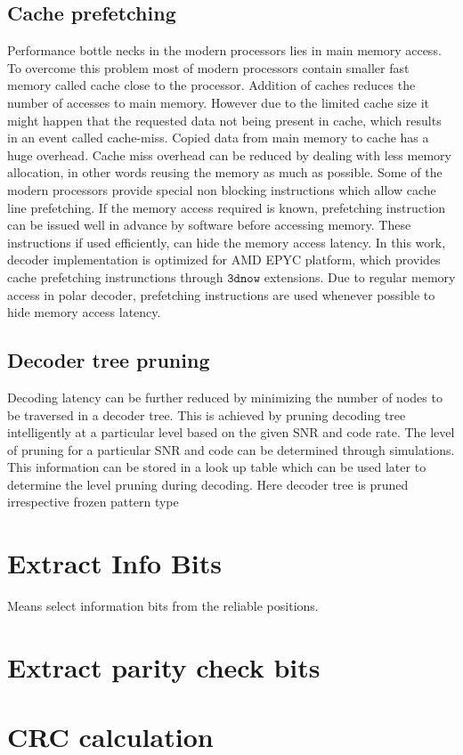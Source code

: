 \subsection{Cache prefetching}
Performance bottle necks in the modern processors lies in main memory access. To overcome this problem most of modern processors contain smaller fast memory called cache close to the processor. Addition of caches reduces the number of accesses to main memory. However due to the limited cache size it might happen that the requested data not being present in cache, which results in an event called cache-miss. Copied data from main memory to cache has a huge overhead. Cache miss overhead can be reduced by dealing with less memory allocation, in other words reusing the memory as much as possible. Some of the modern processors provide special non blocking instructions which allow cache line prefetching. If the memory access required is known, prefetching instruction can be issued well in advance by software before accessing memory. These instructions if used efficiently, can hide the memory access latency. In this work, decoder implementation is optimized for AMD EPYC platform, which provides cache prefetching instrunctions through $ \mathtt{3dnow} $ extensions. Due to regular memory access in polar decoder, prefetching instructions are used whenever possible to hide memory access latency.

\subsection{Decoder tree pruning}
Decoding latency can be further reduced by minimizing the number of nodes to be traversed in a decoder tree. This is achieved by pruning decoding tree intelligently at a particular level based on the given SNR and code rate. The level of pruning for a particular SNR and code can be determined through simulations. This information can be stored in a look up table which can be used later to determine the level pruning during decoding. Here decoder tree is pruned irrespective frozen pattern type


\section{Extract Info Bits}
Means select information bits from the reliable positions.

\section{Extract parity check bits}

\section{CRC calculation}


